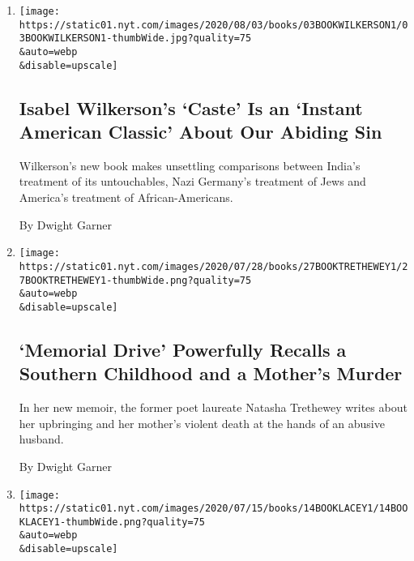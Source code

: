 \begin{enumerate}
\def\labelenumi{\arabic{enumi}.}
\item
  \href{/2020/07/31/books/review-caste-isabel-wilkerson-origins-of-our-discontents.html}{}

  \texttt{[image: https://static01.nyt.com/images/2020/08/03/books/03BOOKWILKERSON1/03BOOKWILKERSON1-thumbWide.jpg?quality=75\\\&auto=webp\\\&disable=upscale]}

  \hypertarget{isabel-wilkersons-caste-is-an-instant-american-classic-about-our-abiding-sin}{%
  \subsection{Isabel Wilkerson's `Caste' Is an `Instant American
  Classic' About Our Abiding
  Sin}\label{isabel-wilkersons-caste-is-an-instant-american-classic-about-our-abiding-sin}}

  Wilkerson's new book makes unsettling comparisons between India's
  treatment of its untouchables, Nazi Germany's treatment of Jews and
  America's treatment of African-Americans.

  By Dwight Garner
\item
  \href{/2020/07/27/books/review-memorial-drive-memoir-natasha-trethewey.html}{}

  \texttt{[image: https://static01.nyt.com/images/2020/07/28/books/27BOOKTRETHEWEY1/27BOOKTRETHEWEY1-thumbWide.png?quality=75\\\&auto=webp\\\&disable=upscale]}

  \hypertarget{memorial-drive-powerfully-recalls-a-southern-childhood-and-a-mothers-murder}{%
  \subsection{`Memorial Drive' Powerfully Recalls a Southern Childhood
  and a Mother's
  Murder}\label{memorial-drive-powerfully-recalls-a-southern-childhood-and-a-mothers-murder}}

  In her new memoir, the former poet laureate Natasha Trethewey writes
  about her upbringing and her mother's violent death at the hands of an
  abusive husband.

  By Dwight Garner
\item
  \href{/2020/07/13/books/review-pew-catherine-lacey.html}{}

  \texttt{[image: https://static01.nyt.com/images/2020/07/15/books/14BOOKLACEY1/14BOOKLACEY1-thumbWide.png?quality=75\\\&auto=webp\\\&disable=upscale]}

  \hypertarget{in-pew-a-mysterious-stranger-tests-a-small-towns-tolerance}{%
}
\end{enumerate}
